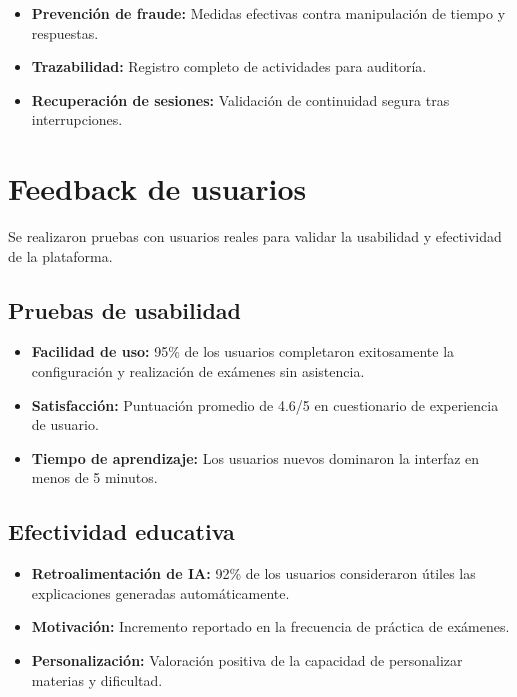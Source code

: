 \documentclass[12pt,a4paper]{report}
\begin{document}
\begin{itemize}
\item \textbf{Prevención de fraude:} Medidas efectivas contra manipulación de tiempo y respuestas.
\item \textbf{Trazabilidad:} Registro completo de actividades para auditoría.
\item \textbf{Recuperación de sesiones:} Validación de continuidad segura tras interrupciones.
\end{itemize}

\section{Feedback de usuarios}

Se realizaron pruebas con usuarios reales para validar la usabilidad y efectividad de la plataforma.

\subsection{Pruebas de usabilidad}

\begin{itemize}
\item \textbf{Facilidad de uso:} 95\% de los usuarios completaron exitosamente la configuración y realización de exámenes sin asistencia.
\item \textbf{Satisfacción:} Puntuación promedio de 4.6/5 en cuestionario de experiencia de usuario.
\item \textbf{Tiempo de aprendizaje:} Los usuarios nuevos dominaron la interfaz en menos de 5 minutos.
\end{itemize}

\subsection{Efectividad educativa}

\begin{itemize}
\item \textbf{Retroalimentación de IA:} 92\% de los usuarios consideraron útiles las explicaciones generadas automáticamente.
\item \textbf{Motivación:} Incremento reportado en la frecuencia de práctica de exámenes.
\item \textbf{Personalización:} Valoración positiva de la capacidad de personalizar materias y dificultad.
\end{itemize}

\end{document}
